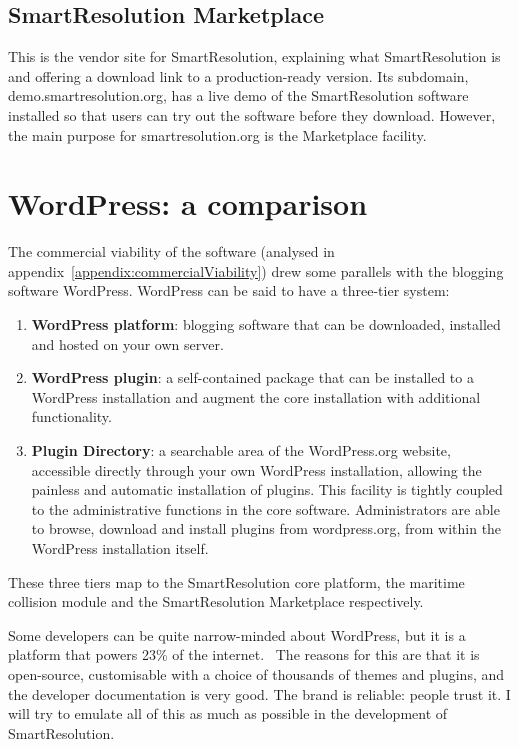 \subsection{SmartResolution Marketplace}

This is the vendor site for SmartResolution, explaining what SmartResolution is and offering a download link to a production-ready version. Its subdomain, demo.smartresolution.org, has a live demo of the SmartResolution software installed so that users can try out the software before they download. However, the main purpose for smartresolution.org is the Marketplace facility.

\section{WordPress: a comparison}

The commercial viability of the software (analysed in appendix~\ref{appendix:commercialViability}) drew some parallels with the blogging software WordPress. WordPress can be said to have a three-tier system:

\begin{enumerate}
    \item \textbf{WordPress platform}: blogging software that can be downloaded, installed and hosted on your own server.

    \item \textbf{WordPress plugin}: a self-contained package that can be installed to a WordPress installation and augment the core installation with additional functionality.

    \item \textbf{Plugin Directory}: a searchable area of the WordPress.org website, accessible directly through your own WordPress installation, allowing the painless and automatic installation of plugins. This facility is tightly coupled to the administrative functions in the core software. Administrators are able to browse, download and install plugins from wordpress.org, from within the WordPress installation itself.
\end{enumerate}

These three tiers map to the SmartResolution core platform, the maritime collision module and the SmartResolution Marketplace respectively.

Some developers can be quite narrow-minded about WordPress, but it is a platform that powers 23\% of the internet.~\cite{wordpressPopular} The reasons for this are that it is open-source, customisable with a choice of thousands of themes and plugins, and the developer documentation is very good. The brand is reliable: people trust it. I will try to emulate all of this as much as possible in the development of SmartResolution.

